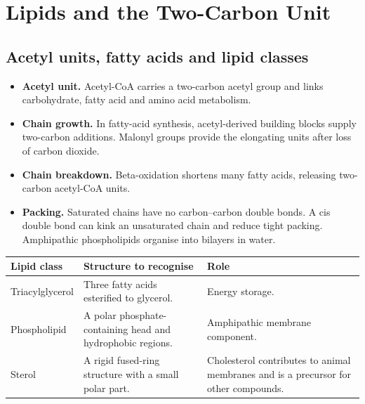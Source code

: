 \documentclass[12pt,a4paper]{article}
\begin{document}
\section{Lipids and the Two-Carbon Unit}
\subsection{Acetyl units, fatty acids and lipid classes}
\begin{itemize}[leftmargin=*, itemsep=3pt, topsep=4pt]
  \item \textbf{Acetyl unit.} Acetyl-CoA carries a two-carbon acetyl group and links carbohydrate, fatty acid and amino acid metabolism.
  \item \textbf{Chain growth.} In fatty-acid synthesis, acetyl-derived building blocks supply two-carbon additions. Malonyl groups provide the elongating units after loss of carbon dioxide.
  \item \textbf{Chain breakdown.} Beta-oxidation shortens many fatty acids, releasing two-carbon acetyl-CoA units.
  \item \textbf{Packing.} Saturated chains have no carbon--carbon double bonds. A cis double bond can kink an unsaturated chain and reduce tight packing. Amphipathic phospholipids organise into bilayers in water.
\end{itemize}
\par\vspace{5pt}
\begingroup
\setlength{\extrarowheight}{1pt}
\noindent\begin{tabularx}{\linewidth}{|B{3.2cm}|Y|Y|}
\hline
\textbf{Lipid class} & \textbf{Structure to recognise} & \textbf{Role} \\ \hline
Triacylglycerol & Three fatty acids esterified to glycerol. & Energy storage. \\ \hline
Phospholipid & A polar phosphate-containing head and hydrophobic regions. & Amphipathic membrane component. \\ \hline
Sterol & A rigid fused-ring structure with a small polar part. & Cholesterol contributes to animal membranes and is a precursor for other compounds. \\ \hline
\end{tabularx}\par
\endgroup
\begin{tcolorbox}[tikzbox, title={Simplified phospholipid bilayer}]
\centering
{}\par
\end{tcolorbox}
\end{document}
